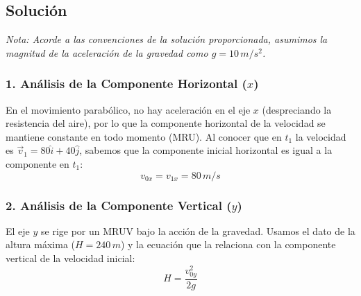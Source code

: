 \documentclass[12pt, a4paper]{article}
\begin{document}
\begin{center}
\end{center}

\subsection*{Solución}

\textit{Nota: Acorde a las convenciones de la solución proporcionada, asumimos la magnitud de la aceleración de la gravedad como $g = 10 \, \si{m/s^2}$.}

\subsubsection*{1. Análisis de la Componente Horizontal ($x$)}
En el movimiento parabólico, no hay aceleración en el eje $x$ (despreciando la resistencia del aire), por lo que la componente horizontal de la velocidad se mantiene constante en todo momento (MRU). 
Al conocer que en $t_1$ la velocidad es $\vec{v}_1 = 80\hat{i} + 40\hat{j}$, sabemos que la componente inicial horizontal es igual a la componente en $t_1$:
$$ v_{0x} = v_{1x} = 80 \, \si{m/s} $$

\subsubsection*{2. Análisis de la Componente Vertical ($y$)}
El eje $y$ se rige por un MRUV bajo la acción de la gravedad. Usamos el dato de la altura máxima ($H = 240 \, \si{m}$) y la ecuación que la relaciona con la componente vertical de la velocidad inicial:
$$ H = \frac{v_{0y}^2}{2g} $$
\end{document}
